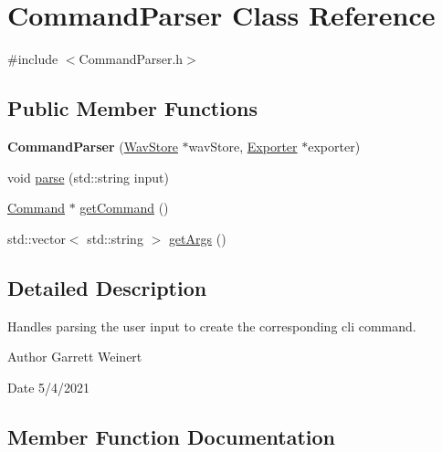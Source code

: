 \hypertarget{classCommandParser}{}\section{Command\+Parser Class Reference}
\label{classCommandParser}


{\ttfamily \#include $<$Command\+Parser.\+h$>$}

\subsection*{Public Member Functions}
\begin{DoxyCompactItemize}
\item 
\mbox{\label{classCommandParser_a9146c54706cabfb837ba34709b2db02c}} 
{\bfseries Command\+Parser} (\hyperlink{classWavStore}{Wav\+Store} $\ast$wav\+Store, \hyperlink{classExporter}{Exporter} $\ast$exporter)
\item 
void \hyperlink{classCommandParser_a803c2a599cae6e722c198e6ba3dc9caf}{parse} (std\+::string input)
\item 
\hyperlink{classCommand}{Command} $\ast$ \hyperlink{classCommandParser_ab5697cd3e81c17b9963e21a6c135341f}{get\+Command} ()
\item 
std\+::vector$<$ std\+::string $>$ \hyperlink{classCommandParser_ab669ec9934f3c7f0490b3fed5b70e56c}{get\+Args} ()
\end{DoxyCompactItemize}


\subsection{Detailed Description}
Handles parsing the user input to create the corresponding cli command. \begin{DoxyAuthor}{Author}
Garrett Weinert 
\end{DoxyAuthor}
\begin{DoxyDate}{Date}
5/4/2021 
\end{DoxyDate}


\subsection{Member Function Documentation}
\mbox{\label{classCommandParser_ab669ec9934f3c7f0490b3fed5b70e56c}} 
